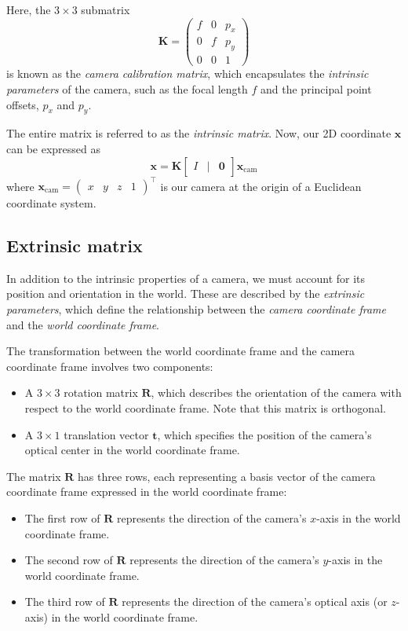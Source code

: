 \documentclass[12pt]{article}
\begin{document}
Here, the $3 \times 3$ submatrix
$$
\mathbf{K} = \begin{pmatrix}
f & 0 & p_x \\
0 & f & p_y \\
0 & 0 & 1
\end{pmatrix}
$$
is known as the \textit{camera calibration matrix}, which encapsulates the \textit{intrinsic parameters} of the camera, such as the focal length $f$ and the principal point offsets, $p_x$ and $p_y$.

The entire matrix is referred to as the \textit{intrinsic matrix}. Now, our 2D coordinate  $\mathbf{x}$ can be expressed as
$$
\mathbf{x} = \mathbf{K}\begin{bmatrix}
    I & | & \mathbf{0}
\end{bmatrix}\mathbf{x}_\text{cam}
$$
where $\mathbf{x}_\text{cam}=\begin{pmatrix}
    x & y & z & 1
\end{pmatrix}^\top$ is our camera at the origin of a Euclidean coordinate system.

\subsection{Extrinsic matrix}

In addition to the intrinsic properties of a camera, we must account for its position and orientation in the world. These are described by the \textit{extrinsic parameters}, which define the relationship between the \textit{camera coordinate frame} and the \textit{world coordinate frame}. 

The transformation between the world coordinate frame and the camera coordinate frame involves two components:
\begin{itemize}
    \item A $3 \times 3$ rotation matrix $\mathbf{R}$, which describes the orientation of the camera with respect to the world coordinate frame. Note that this matrix is orthogonal.
    \item A $3 \times 1$ translation vector $\mathbf{t}$, which specifies the position of the camera's optical center in the world coordinate frame.
\end{itemize}

The matrix $\mathbf{R}$ has three rows, each representing a basis vector of the camera coordinate frame expressed in the world coordinate frame:
\begin{itemize}
    \item The first row of $\mathbf{R}$ represents the direction of the camera's $x$-axis in the world coordinate frame.
    \item The second row of $\mathbf{R}$ represents the direction of the camera's $y$-axis in the world coordinate frame.
    \item The third row of $\mathbf{R}$ represents the direction of the camera's optical axis (or $z$-axis) in the world coordinate frame.
\end{itemize}
\end{document}
